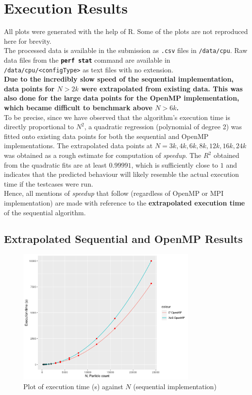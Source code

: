 \documentclass[12pt]{article}
\newcommand{\bt}[1]{\texttt{\textbf{#1}}}
\begin{document}
\section{Execution Results}

All plots were generated with the help of R. Some of the plots are not reproduced here for brevity.\\

The processed data is available in the submission as \texttt{.csv} files in \texttt{/data/cpu}. Raw data files from the \bt{perf stat} command are available in \texttt{/data/cpu/<configType>} as text files with no extension.\\

\textbf{Due to the incredibly slow speed of the sequential implementation, data points for $N > 2k$ were extrapolated from existing data. This was also done for the large data points for the OpenMP implementation, which became difficult to benchmark above $N > 6k$.}\\

To be precise, since we have observed that the algorithm's execution time is directly proportional to $N^2$, a quadratic regression (polynomial of degree 2) was fitted onto existing data points for both the sequential and OpenMP implementations. The extrapolated data points at $N = 3k, 4k, 6k, 8k, 12k, 16k, 24k$ was obtained as a rough estimate for computation of \textit{speedup}. The $R^2$ obtained from the quadratic fits are at least $0.99991$, which is sufficiently close to $1$ and indicates that the predicted behaviour will likely resemble the actual execution time if the testcases were run.\\

Hence, all mentions of \textit{speedup} that follow (regardless of OpenMP or MPI implementation) are made with reference to the \textbf{extrapolated execution time} of the sequential algorithm.

\subsection{Extrapolated Sequential and OpenMP Results}

\begin{figure}[H]
    \centering
    \includegraphics[width=0.8\textwidth]{processedCpuResults/seqExtrapolate.png}
    \caption{Plot of execution time (s) against $N$ (sequential implementation)}
    \label{fig:seqExtrapolate}
\end{figure}
\end{document}
